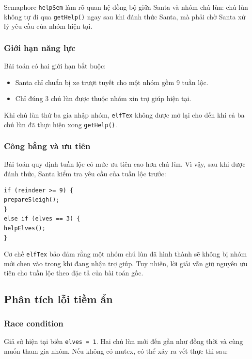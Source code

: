 Semaphore \texttt{helpSem} làm rõ quan hệ đồng bộ giữa Santa và nhóm
chú lùn: chú lùn không tự đi qua \texttt{getHelp()} ngay sau khi đánh
thức Santa, mà phải chờ Santa xử lý yêu cầu của nhóm hiện tại.

\subsubsection*{Giới hạn năng lực}

Bài toán có hai giới hạn bắt buộc:

\begin{itemize}
\item Santa chỉ chuẩn bị xe trượt tuyết cho một nhóm gồm 9 tuần lộc.
\item Chỉ đúng 3 chú lùn được thuộc nhóm xin trợ giúp hiện tại.
\end{itemize}

Khi chú lùn thứ ba gia nhập nhóm, \texttt{elfTex} không được mở lại cho
đến khi cả ba chú lùn đã thực hiện xong \texttt{getHelp()}.

\subsubsection*{Công bằng và ưu tiên}

Bài toán quy định tuần lộc có mức ưu tiên cao hơn chú lùn. Vì vậy, sau
khi được đánh thức, Santa kiểm tra yêu cầu của tuần lộc trước:

\begin{lstlisting}
if (reindeer >= 9) {
prepareSleigh();
}
else if (elves == 3) {
helpElves();
}
\end{lstlisting}

Cơ chế \texttt{elfTex} bảo đảm rằng một nhóm chú lùn đã hình thành sẽ
không bị nhóm mới chen vào trong khi đang nhận trợ giúp. Tuy nhiên, lời
giải vẫn giữ nguyên ưu tiên cho tuần lộc theo đặc tả của bài toán gốc.


\subsection{Phân tích lỗi tiềm ẩn}

\subsubsection*{Race condition}

Giả sử hiện tại biến \texttt{elves = 1}. Hai chú lùn mới đến gần như
đồng thời và cùng muốn tham gia nhóm. Nếu không có mutex, có thể xảy ra
vết thực thi sau:

